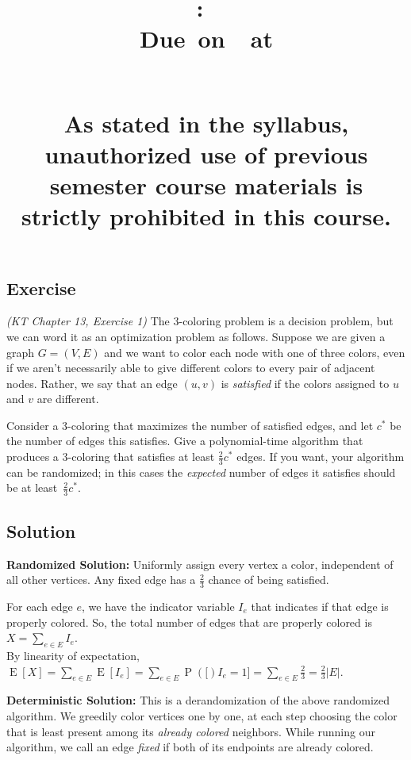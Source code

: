 \documentclass{article}
\title{
    \vspace{2in}
    \textbf{\hmwkClass:\ \hmwkTitle}\\
    \normalsize\vspace{0.1in}\small{Due\ on\ \hmwkDueDate\ at \hmwkDueTime}\\
    \vspace{0.1in}\large{\textit{\hmwkClassInstructor\ \hmwkSection}} \\
    \vspace{0.8in}
    \begin{minipage}[t]{0.4\columnwidth}
        {\footnotesize\textbf{As stated in the syllabus, unauthorized use of previous semester course materials is strictly prohibited in this course.
        }}
    \vspace{0.5in}
    \end{minipage}
    \vspace{0.8in}
    \author{\textbf{\hmwkAuthorName}}
    \date{}
}
\newcounter{counter}
\newcommand{\Exercise}{Exercise \stepcounter{counter}\thecounter}
\newcommand{\E}[1]{\operatorname{E}\left[#1\right]}
\renewcommand{\Pr}[1]{\operatorname{P}\left(#1\right)}
\begin{document}
\maketitle
\pagebreak

\subsection*{\Exercise}
    \textit{(KT Chapter 13, Exercise 1)} The 3-coloring problem is a decision problem, but we can word it as an optimization problem as follows.  Suppose we are given a graph $G = (V, E)$ and we want to color each node with one of three colors, even if we aren't necessarily able to give different colors to every pair of adjacent nodes.  Rather, we say that an edge $(u,v)$ is {\it satisfied} if the colors assigned to $u$ and $v$ are different.  

    \vspace{3mm}
    Consider a 3-coloring that maximizes the number of satisfied edges, and let $c^*$ be the number of edges this satisfies.  Give a polynomial-time algorithm that produces a 3-coloring that satisfies at least $\frac23 c^*$ edges.  If you want, your algorithm can be randomized; in this cases the {\it expected} number of edges it satisfies should be at least~$\frac23 c^*$.

\subsection*{Solution}
    \textbf{Randomized Solution:} Uniformly assign every vertex a color, independent of all other vertices. Any fixed edge has a $\frac{2}{3}$ chance of being satisfied.

    \vspace{3mm}
    For each edge $e$, we have the indicator variable $I_e$ that indicates if that edge is properly colored. So, the total number of edges that are properly colored is $X = \sum_{e \in E} I_e$.\\ By linearity of expectation, $\E{X} = \sum_{e \in E} \E{I_e} = \sum_{e \in E} \Pr[I_e = 1] = \sum_{e \in E} \frac{2}{3} = \frac{2}{3} |E|$.

    \vspace{3mm}
    \textbf{Deterministic Solution:} This is a derandomization of the above randomized algorithm. We greedily color vertices one by one, at each step choosing the color that is least present among its \emph{already colored} neighbors. While running our algorithm, we call an edge \emph{fixed} if both of its endpoints are already colored.
\end{document}
